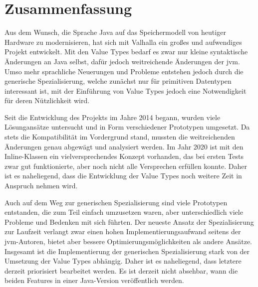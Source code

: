 \section{Zusammenfassung}\label{sec:summary}

Aus dem Wunsch, die Sprache Java auf das Speichermodell von heutiger Hardware zu modernisieren, hat sich mit Valhalla ein großes und aufwendiges Projekt entwickelt.
Mit den Value Types bedarf es zwar nur kleine syntaktische Änderungen an Java selbst, dafür jedoch weitreichende Änderungen der \ac{jvm}.
Umso mehr sprachliche Neuerungen und Probleme entstehen jedoch durch die generische Spezialisierung, welche zunächst nur für primitiven Datentypen interessant ist, mit der Einführung von Value Types jedoch eine Notwendigkeit für deren Nützlichkeit wird.

Seit die Entwicklung des Projekts im Jahre 2014 begann, wurden viele Lösungansätze untersucht und in Form verschiedener Prototypen umgesetzt.
Da stets die Kompatibilität im Vordergrund stand, mussten die weitreichenden Änderungen genau abgewägt und analysiert werden.
Im Jahr 2020 ist mit den Inline-Klassen ein vielversprechendes Konzept vorhanden, das bei ersten Tests zwar gut funktionierte, aber noch nicht alle Versprechen erfüllen konnte.
Daher ist es naheliegend, dass die Entwicklung der Value Types noch weitere Zeit in Anspruch nehmen wird.

Auch auf dem Weg zur generischen Spezialisierung sind viele Prototypen entstanden, die zum Teil einfach umzusetzen waren, aber unterschiedlich viele Probleme und Bedenken mit sich führten.
Der neueste Ansatz der Spezialisierung zur Laufzeit verlangt zwar einen hohen Implementierungsaufwand seitens der \ac{jvm}-Autoren, bietet aber bessere Optimierungsmöglichkeiten als andere Ansätze.
Insgesamt ist die Implementierung der generischen Spezialisierung stark von der Umsetzung der Value Types abhängig.
Daher ist es naheliegend, dass letztere derzeit priorisiert bearbeitet werden.
Es ist derzeit nicht absehbar, wann die beiden Features in einer Java-Version veröffentlich werden.
